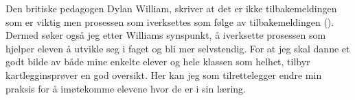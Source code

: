 \documentclass[main.tex]{subfiles}
\begin{document}
Den britiske pedagogen Dylan William, skriver at det er ikke 
tilbakemeldingen som er viktig men prosessen som iverksettes som følge av tilbakemeldingen (). 
Dermed søker også jeg etter Williams synspunkt, å iverksette prosessen som hjelper eleven å utvikle seg i faget og bli 
mer selvstendig. For at jeg skal danne et godt  bilde av både mine enkelte elever og hele klassen som helhet, tilbyr 
kartlegginsprøver en god oversikt. Her kan jeg som tilrettelegger endre min praksis for å imøtekomme elevene hvor de er i 
sin læring.
\end{document}
